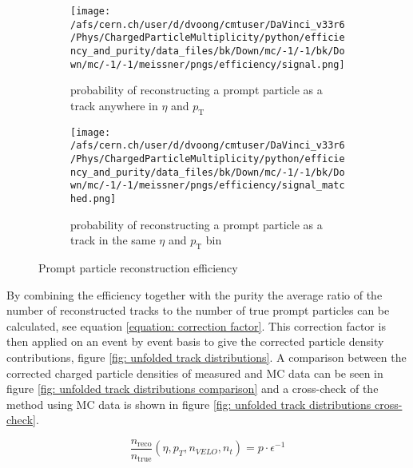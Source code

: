 \begin{figure}[h]
	\centering
	\begin{subfigure}{0.49\textwidth}
		\texttt{[image: /afs/cern.ch/user/d/dvoong/cmtuser/DaVinci\_v33r6/Phys/ChargedParticleMultiplicity/python/efficiency\_and\_purity/data\_files/bk/Down/mc/-1/-1/bk/Down/mc/-1/-1/meissner/pngs/efficiency/signal.png]}
		\caption{probability of reconstructing a prompt particle as a track anywhere in $\eta$ and $p_\mathrm{T}$}
		\label{fig: reconstruction efficiency, signal}
	\end{subfigure}
	\begin{subfigure}{0.49\textwidth}
		\texttt{[image: /afs/cern.ch/user/d/dvoong/cmtuser/DaVinci\_v33r6/Phys/ChargedParticleMultiplicity/python/efficiency\_and\_purity/data\_files/bk/Down/mc/-1/-1/bk/Down/mc/-1/-1/meissner/pngs/efficiency/signal\_matched.png]}
		\caption{probability of reconstructing a prompt particle as a track in the same $\eta$ and $p_\mathrm{T}$ bin}
		\label{fig: reconstruction efficiency, signal matched}
	\end{subfigure}
	\caption{Prompt particle reconstruction efficiency}
	\label{fig: reconstruction efficiency}
\end{figure}

By combining the efficiency together with the purity the average ratio of the number of reconstructed tracks to the number of true prompt particles can be calculated, see equation \ref{equation: correction factor}. This correction factor is then applied on an event by event basis to give the corrected particle density contributions, figure \ref{fig: unfolded track distributions}. A comparison between the corrected charged particle densities of measured and MC data can be seen in figure \ref{fig: unfolded track distributions comparison} and a cross-check of the method using MC data is shown in figure \ref{fig: unfolded track distributions cross-check}.

\begin{equation}
	\frac{n_\mathrm{reco}}{n_\mathrm{true}}(\eta, p_T, n_{VELO}, n_t) = p \cdot \epsilon^{-1}
	\label{equation: correction factor}
\end{equation}




